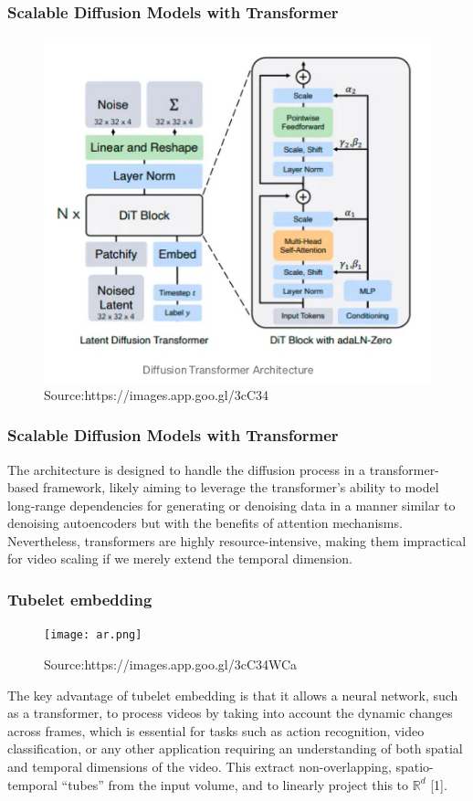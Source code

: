 \documentclass[11pt]{beamer}
\begin{document}
\begin{frame}
	\frametitle{Scalable Diffusion Models with Transformer}
	
\begin{figure}
	\centering
	\includegraphics[width=0.55\linewidth]{dit.png} 
	\caption{Source:https://images.app.goo.gl/3cC34}
	\label{fig: Source: https://images.app.goo.gl/3cC34WCaGwAApw9o9} %
\end{figure}

\end{frame}

\begin{frame}
	\frametitle{Scalable Diffusion Models with Transformer}
	
The architecture is designed to handle the diffusion process in a transformer-based framework, likely aiming to leverage the transformer's ability to model long-range dependencies for generating or denoising data in a manner similar to denoising autoencoders but with the benefits of attention mechanisms. Nevertheless, transformers are highly resource-intensive, making them impractical for video scaling if we merely extend the temporal dimension.
\end{frame}


\begin{frame}
	\frametitle{Tubelet embedding}
	
	\begin{figure}
		\centering
		\texttt{[image: ar.png]} 
		\caption{Source:https://images.app.goo.gl/3cC34WCa}
		\label{fig: Source: https://images.app.goo.gl/3cC34WCaGwAApw9o9} %
	\end{figure}
	The key advantage of tubelet embedding is that it allows a neural network, such as a transformer, to process videos by taking into account the dynamic changes across frames, which is essential for tasks such as action recognition, video classification, or any other application requiring an understanding of both spatial and temporal dimensions of the video. This extract non-overlapping, spatio-temporal “tubes” from the input volume, and to linearly project this to $\mathbb{R}^d$ [1].
\end{frame}
\end{document}

